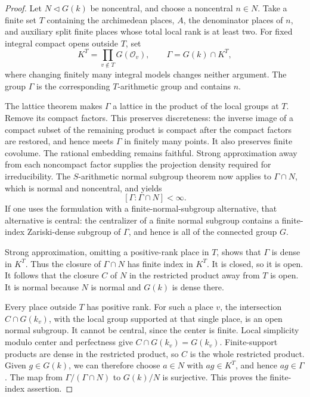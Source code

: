 \begin{proof}
Let \(N\lhd G(k)\) be noncentral, and choose a noncentral \(n\in N\).
Take a finite set \(T\) containing the archimedean places, \(A\),
the denominator places of \(n\), and auxiliary split finite places
whose total local rank is at least two.  For fixed integral compact
opens outside \(T\), set
\[
 K^T=\prod_{v\notin T}G(\mathcal O_v),\qquad
 \Gamma=G(k)\cap K^T,
\]
where changing finitely many integral models changes neither argument.
The group \(\Gamma\) is the corresponding \(T\)-arithmetic group and
contains \(n\).

The lattice theorem \cite[Theorem~5.7(1)]{PRbook} makes \(\Gamma\) a lattice in the product of the
local groups at \(T\).  Remove its compact factors.  This preserves
discreteness: the inverse image of a compact subset of the remaining
product is compact after the compact factors are restored, and hence
meets \(\Gamma\) in finitely many points.  It also preserves finite
covolume.  The rational embedding remains faithful.  Strong
approximation away from each noncompact factor supplies the projection
density required for irreducibility.  The \(S\)-arithmetic normal
subgroup theorem now applies to \(\Gamma\cap N\), which is normal and
noncentral, and yields
\[
                         [\Gamma:\Gamma\cap N]<\infty .
\]
If one uses the formulation with a finite-normal-subgroup alternative,
that alternative is central: the centralizer of a finite normal
subgroup contains a finite-index Zariski-dense subgroup of \(\Gamma\),
and hence is all of the connected group \(G\).

Strong approximation, omitting a positive-rank place in \(T\), shows
that \(\Gamma\) is dense in \(K^T\).  Thus the closure of
\(\Gamma\cap N\) has finite index in \(K^T\).  It is closed, so it
is open.  It follows that the closure \(C\) of \(N\) in the restricted
product away from \(T\) is open.  It is normal because \(N\) is
normal and \(G(k)\) is dense there.

Every place outside \(T\) has positive rank.  For such a place \(v\),
the intersection \(C\cap G(k_v)\), with the local group supported at
that single place, is an open normal subgroup.  It cannot be central,
since the center is finite.  Local simplicity modulo center and
perfectness give \(C\cap G(k_v)=G(k_v)\).
Finite-support products are dense in the restricted product, so
\(C\) is the whole restricted product.  Given \(g\in G(k)\), we can
therefore choose \(a\in N\) with \(ag\in K^T\), and hence \(ag\in\Gamma\).
The map from \(\Gamma/(\Gamma\cap N)\) to \(G(k)/N\) is surjective.
This proves the finite-index assertion.


\end{proof}
